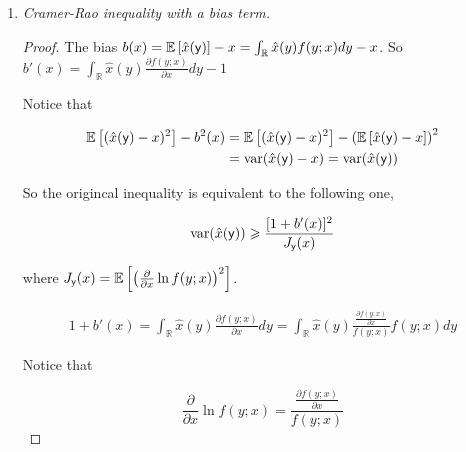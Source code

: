 \documentclass[a4paper]{article}
\begin{document}
\vspace{2em}


\begin{enumerate}
  \setlength{\itemsep}{3\parskip}

    \item \textit{Cramer-Rao inequality with a bias term.}
    
    \begin{proof}

        The bias $b(x) = \operatorname{\mathbb{E}}\left[\hat{x}(\mathsf{y})\right] -x = \int_{\mathbb{R}} \hat{x}(y) f(y;x)dy - x$. So $b'(x) =  \int_{\mathbb{R}} \hat{x}(y) \frac{\partial f(y;x)}{\partial x }dy -1 $

        Notice that 

        \begin{equation}
          \begin{aligned}
            \operatorname{\mathbb{E}}\left[(\hat{x}(\mathsf{y})-x)^2\right] - b^2(x) & = \operatorname{\mathbb{E}}\left[(\hat{x}(\mathsf{y})-x)^2\right] - \left(\operatorname{\mathbb{E}}\left[\hat{x}(\mathsf{y})-x\right]\right)^2 \\ &= \operatorname{var}(\hat{x}(\mathsf{y})-x) = \operatorname{var}(\hat{x}(\mathsf{y}))
          \end{aligned}
        \end{equation}

        So the origincal inequality is equivalent to the following one,

        \begin{equation}
          \operatorname{var}(\hat{x}(\mathsf{y})) \geqslant \frac{[1+b'(x)]^2}{J_{\mathsf{y}}(x)}
        \end{equation}

        where $J_{\mathsf{y}}(x) = \operatorname{\mathbb{E}} \left[\left( \frac{\partial}{\partial x} \ln f(y;x)\right)^2\right] $.

          \begin{equation}
            \begin{aligned}
              1+b'(x) = \int_{\mathbb{R}} \hat{x}(y) \frac{\partial f(y;x)}{\partial x } dy= \int_{\mathbb{R}} \hat{x}(y) \frac{\frac{\partial f(y;x)}{\partial x }}{ f(y;x)} f(y;x) dy
            \end{aligned}
          \end{equation}

          Notice that 

          \begin{equation}
            \frac{\partial}{\partial x} \ln f(y;x) =  \frac{\frac{\partial f(y;x)}{\partial x }}{ f(y;x)}
          \end{equation}


\end{proof}
\end{enumerate}
\end{document}
